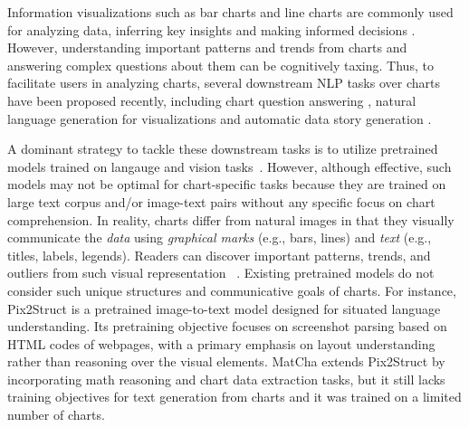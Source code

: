 \documentclass[11pt]{article}
\begin{document}
Information visualizations such as bar charts and line charts are commonly used for analyzing data,  inferring key insights and making informed decisions \cite{hoque2022chartSurvey}. However, understanding important patterns and trends from charts and answering complex questions about them can be cognitively taxing. Thus, to facilitate users in analyzing charts, several downstream NLP tasks over charts have been proposed recently, including chart question answering  \cite{masry-etal-2022-chartqa, open-CQA, lee2022pix2struct}, natural language generation for visualizations \cite{obeid-hoque-2020-chart, chart-to-text-acl} and automatic data story generation \cite{shi2020calliope}.

A dominant strategy to tackle these downstream tasks is to utilize pretrained models \cite{Su2020VL-BERT,li-etal-2020-bert-vision, vilt,vlt5} trained on langauge and vision tasks~\cite{ijcai2022p762}. However, although effective, such models may not be  optimal for chart-specific tasks because they are trained on large text corpus and/or image-text pairs without any specific focus on chart comprehension. In reality, charts differ from natural images in that they visually communicate the \textit{data} using \textit{graphical marks} (e.g., bars, lines) and \textit{text} (e.g., titles, labels, legends). Readers can discover important patterns, trends, and outliers from such visual representation 
~\cite{munzner2014visualization}. Existing pretrained models do not consider such unique structures and communicative goals of charts. For instance, Pix2Struct \cite{lee2022pix2struct} is a pretrained image-to-text model designed for situated language understanding. Its pretraining objective focuses on screenshot parsing based on HTML codes of webpages, with a primary emphasis on layout understanding rather than reasoning over the visual elements. 
MatCha \cite{liu2022matcha} extends Pix2Struct by incorporating math reasoning and chart data extraction tasks, but it still lacks training objectives for text generation from charts and it was trained on a limited number of charts.
\end{document}
